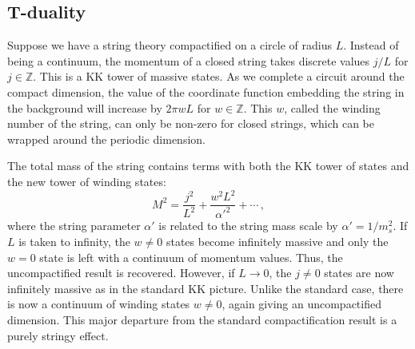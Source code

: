 

\subsection{T-duality}
\label{sec:tduality-dbiintro}
Suppose we have a string theory compactified on a circle of radius $L$. Instead
of being a continuum, the momentum of a closed string takes discrete values
$j/L$ for $j \in \mathbb{Z}$. This is a KK tower of massive states. As we
complete a circuit around the compact dimension, the value of the coordinate
function embedding the string in the background will increase by $2\pi w
L$ for $w \in \mathbb{Z}$. This $w$, called the winding number of the string,
can only be non-zero for closed strings, which can be wrapped around the periodic
dimension.

The total mass of the string contains terms with both the KK tower of states
and the new tower of winding states:
\begin{equation}
\label{eq:closedmass-dbiintro}
 M^2 = \frac{j^2}{L^2} + \frac{w^2 L^2}{\alpha'^2} + \cdots\,,
\end{equation}
where the string parameter $\alpha'$ is related to the string mass scale by
$\alpha'=1/m_s^2$.
If $L$ is taken to infinity, the $w\ne 0$ states become infinitely massive and
only the $w=0$ state is left with a continuum of momentum values. Thus, the
uncompactified result is recovered. However, if $L\rightarrow0$, the $j\ne 0$
states are now infinitely massive as in the standard KK picture. Unlike the
standard case, there is now a continuum of winding states $w\ne 0$,
again giving an
uncompactified dimension. This major departure from the standard
compactification result is a purely stringy effect. 

